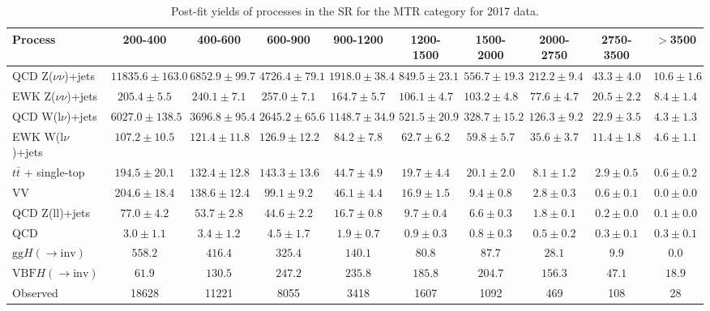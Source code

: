 \begin{table}
    \centering
    \footnotesize
\begin{tabular}{l|c|c|c|c|c|c|c|c|c}
Process & 200-400 & 400-600 & 600-900 & 900-1200 & 1200-1500 & 1500-2000 & 2000-2750 & 2750-3500 & $>$3500  \\
\hline
\hline
QCD Z($\nu\nu$)+jets  & $11835.6\pm163.0$ & $6852.9\pm99.7$ & $4726.4\pm79.1$ & $1918.0\pm38.4$ & $849.5\pm23.1$ & $556.7\pm19.3$ & $212.2\pm9.4$ & $43.3\pm4.0$ & $10.6\pm1.6$\\
EWK Z($\nu\nu$)+jets  & $205.4\pm5.5$ & $240.1\pm7.1$ & $257.0\pm7.1$ & $164.7\pm5.7$ & $106.1\pm4.7$ & $103.2\pm4.8$ & $77.6\pm4.7$ & $20.5\pm2.2$ & $8.4\pm1.4$\\
QCD W(l$\nu$)+jets  & $6027.0\pm138.5$ & $3696.8\pm95.4$ & $2645.2\pm65.6$ & $1148.7\pm34.9$ & $521.5\pm20.9$ & $328.7\pm15.2$ & $126.3\pm9.2$ & $22.9\pm3.5$ & $4.3\pm1.3$\\
EWK W(l$\nu$)+jets  & $107.2\pm10.5$ & $121.4\pm11.8$ & $126.9\pm12.2$ & $84.2\pm7.8$ & $62.7\pm6.2$ & $59.8\pm5.7$ & $35.6\pm3.7$ & $11.4\pm1.8$ & $4.6\pm1.1$\\
$t\bar{t}$ + single-top  & $194.5\pm20.1$ & $132.4\pm12.8$ & $143.3\pm13.6$ & $44.7\pm4.9$ & $19.7\pm4.4$ & $20.1\pm2.0$ & $8.1\pm1.2$ & $2.9\pm0.5$ & $0.6\pm0.2$\\
VV  & $204.6\pm18.4$ & $138.6\pm12.4$ & $99.1\pm9.2$ & $46.1\pm4.4$ & $16.9\pm1.5$ & $9.4\pm0.8$ & $2.8\pm0.3$ & $0.6\pm0.1$ & $0.0\pm0.0$\\
QCD Z(ll)+jets  & $77.0\pm4.2$ & $53.7\pm2.8$ & $44.6\pm2.2$ & $16.7\pm0.8$ & $9.7\pm0.4$ & $6.6\pm0.3$ & $1.8\pm0.1$ & $0.2\pm0.0$ & $0.1\pm0.0$\\
QCD  & $3.0\pm1.1$ & $3.4\pm1.2$ & $4.5\pm1.7$ & $1.9\pm0.7$ & $0.9\pm0.3$ & $0.8\pm0.3$ & $0.5\pm0.2$ & $0.3\pm0.1$ & $0.3\pm0.1$\\
\hline
$\mathrm{gg}H(\rightarrow \mathrm{inv})$  & $558.2$ & $416.4$ & $325.4$ & $140.1$ & $80.8$ & $87.7$ & $28.1$ & $9.9$ & $0.0$\\
$\mathrm{VBF}H(\rightarrow \mathrm{inv})$  & $61.9$ & $130.5$ & $247.2$ & $235.8$ & $185.8$ & $204.7$ & $156.3$ & $47.1$ & $18.9$\\
\hline
Observed & 18628 & 11221 & 8055 & 3418 & 1607 & 1092 & 469 & 108 & 28\\
\hline
\end{tabular}
    \caption{Post-fit yields of processes in the SR for the MTR category for 2017 data.}
    \label{app:MTR_2017_yield}
\end{table}



